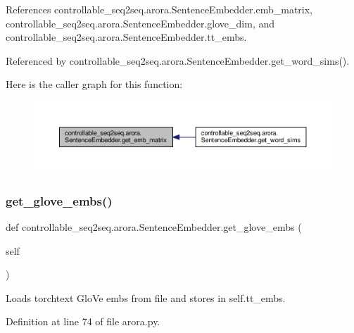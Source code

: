 References controllable\+\_\+seq2seq.\+arora.\+Sentence\+Embedder.\+emb\+\_\+matrix, controllable\+\_\+seq2seq.\+arora.\+Sentence\+Embedder.\+glove\+\_\+dim, and controllable\+\_\+seq2seq.\+arora.\+Sentence\+Embedder.\+tt\+\_\+embs.



Referenced by controllable\+\_\+seq2seq.\+arora.\+Sentence\+Embedder.\+get\+\_\+word\+\_\+sims().

Here is the caller graph for this function\+:
\nopagebreak
\begin{figure}[H]
\begin{center}
\leavevmode
\includegraphics[width=350pt]{classcontrollable__seq2seq_1_1arora_1_1SentenceEmbedder_a3fd8ad770106ea5a883df90ed4bda370_icgraph}
\end{center}
\end{figure}
\mbox{\label{classcontrollable__seq2seq_1_1arora_1_1SentenceEmbedder_aa53ecb589f5fe43fe92d326511491e98}} 
\subsubsection{\texorpdfstring{get\+\_\+glove\+\_\+embs()}{get\_glove\_embs()}}
{\footnotesize\ttfamily def controllable\+\_\+seq2seq.\+arora.\+Sentence\+Embedder.\+get\+\_\+glove\+\_\+embs (\begin{DoxyParamCaption}\item[{}]{self }\end{DoxyParamCaption})}

\begin{DoxyVerb}Loads torchtext GloVe embs from file and stores in self.tt_embs.
\end{DoxyVerb}
 

Definition at line 74 of file arora.\+py.



